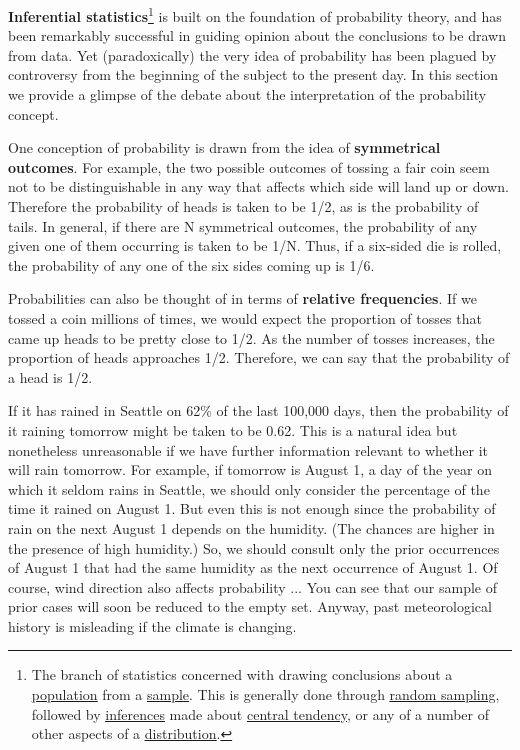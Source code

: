 \documentclass[
  11pt,
,
onecolumn,
openany
]{book}
\begin{document}
\textbf{Inferential statistics}\footnote{The branch of statistics concerned
  with drawing conclusions about a
  \href{https://onlinestatbook.com/2/glossary/population.html}{\underline{population}}
  from a
  \href{https://onlinestatbook.com/2/glossary/sample.html}{\underline{sample}}.
  This is generally done through
  \href{https://onlinestatbook.com/2/glossary/random_sampling.html}{\underline{random
  sampling}}, followed by
  \href{https://onlinestatbook.com/2/glossary/inference.html}{\underline{inferences}}
  made about
  \href{https://onlinestatbook.com/2/glossary/center(distribution).html}{\underline{central
  tendency}}, or any of a number of other aspects of a
  \href{https://onlinestatbook.com/2/glossary/distribution.html}{\underline{distribution}}.}
is built on the foundation of probability theory, and has been remarkably
successful in guiding opinion about the conclusions to be drawn from data. Yet
(paradoxically) the very idea of probability has been plagued by controversy
from the beginning of the subject to the present day. In this section we
provide a glimpse of the debate about the interpretation of the probability
concept.

One conception of probability is drawn from the idea of \textbf{symmetrical
outcomes}. For example, the two possible outcomes of tossing a fair coin seem
not to be distinguishable in any way that affects which side will land up or
down. Therefore the probability of heads is taken to be 1/2, as is the
probability of tails. In general, if there are N symmetrical outcomes, the
probability of any given one of them occurring is taken to be 1/N. Thus, if a
six-sided die is rolled, the probability of any one of the six sides coming up
is 1/6.

Probabilities can also be thought of in terms of \textbf{relative
frequencies}. If we tossed a coin millions of times, we would expect the
proportion of tosses that came up heads to be pretty close to 1/2. As the
number of tosses increases, the proportion of heads approaches 1/2. Therefore,
we can say that the probability of a head is 1/2.

If it has rained in Seattle on 62\% of the last 100,000 days, then the
probability of it raining tomorrow might be taken to be 0.62. This is a
natural idea but nonetheless unreasonable if we have further information
relevant to whether it will rain tomorrow. For example, if tomorrow is August
1, a day of the year on which it seldom rains in Seattle, we should only
consider the percentage of the time it rained on August 1. But even this is
not enough since the probability of rain on the next August 1 depends on the
humidity. (The chances are higher in the presence of high humidity.) So, we
should consult only the prior occurrences of August 1 that had the same
humidity as the next occurrence of August 1. Of course, wind direction also
affects probability ... You can see that our sample of prior cases will soon
be reduced to the empty set. Anyway, past meteorological history is misleading
if the climate is changing.
\end{document}
